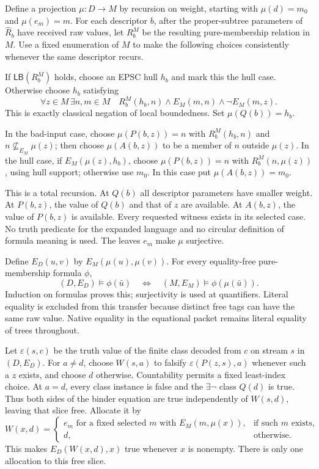 Define a projection $\mu:D\to M$ by recursion on weight, starting
with $\mu(d)=m_0$ and $\mu(e_m)=m$.  For each descriptor $b$, after
the proper-subtree parameters of $\widehat R_b$ have received raw
values, let $R_b^M$ be the resulting pure-membership relation in $M$.
Use a fixed enumeration of $M$ to make the following choices consistently
whenever the same descriptor recurs.

If $\mathsf{LB}(R_b^M)$ holds, choose an EPSC hull $h_b$ and mark
this the hull case.  Otherwise choose $h_b$ satisfying
\begin{equation}
 \forall z\in M\,\exists n,m\in M\quad
 R_b^M(h_b,n)\land E_M(m,n)\land\neg E_M(m,z).
 \label{eq:704-bad-input}
\end{equation}
This is exactly classical negation of local boundedness.  Set
$\mu(Q(b))=h_b$.

In the bad-input case, choose $\mu(P(b,z))=n$ with
$R_b^M(h_b,n)$ and $n\not\subseteq_{E_M}\mu(z)$; then choose
$\mu(A(b,z))$ to be a member of $n$ outside $\mu(z)$.
In the hull case, if $E_M(\mu(z),h_b)$, choose
$\mu(P(b,z))=n$ with $R_b^M(n,\mu(z))$, using hull support;
otherwise use $m_0$.  In this case put $\mu(A(b,z))=m_0$.

This is a total recursion.  At $Q(b)$ all descriptor parameters have
smaller weight.  At $P(b,z)$, the value of $Q(b)$ and that of $z$
are available.  At $A(b,z)$, the value of $P(b,z)$ is available.
Every requested witness exists in its selected case.  No truth
predicate for the expanded language and no circular definition of
formula meaning is used.  The leaves $e_m$ make $\mu$ surjective.

Define $E_D(u,v)$ by $E_M(\mu(u),\mu(v))$.  For every
equality-free pure-membership formula $\phi$,
\begin{equation}
 (D,E_D)\models\phi(\bar u)
 \quad\Longleftrightarrow\quad
 (M,E_M)\models\phi(\mu(\bar u)).
 \label{eq:704-transfer}
\end{equation}
Induction on formulas proves this; surjectivity is used at quantifiers.
Literal equality is excluded from this transfer because distinct free
tags can have the same raw value.  Native equality in the equational
packet remains literal equality of trees throughout.

Let $\varepsilon(s,c)$ be the truth value of the finite class decoded
from $c$ on stream $s$ in $(D,E_D)$.  For $a\ne d$, choose $W(s,a)$
to falsify $\varepsilon(P(z,s),a)$ whenever such a $z$ exists,
and choose $d$ otherwise.  Countability permits a fixed least-index
choice.  At $a=d$, every class instance is false and the
$\exists\neg$ class $Q(d)$ is true.  Thus both sides of the binder
equation are true independently of $W(s,d)$, leaving that slice free.
Allocate it by
\[
 W(x,d)=
 \begin{cases}
 e_m\text{ for a fixed selected }m\text{ with }E_M(m,\mu(x)),
       &\text{if such }m\text{ exists},\\
 d,&\text{otherwise}.
 \end{cases}
\]
This makes $E_D(W(x,d),x)$ true whenever $x$ is nonempty.  There is
only one allocation to this free slice.

